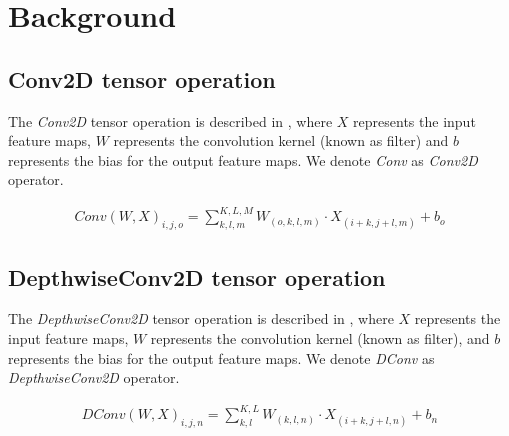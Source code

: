 \section{Background}
\label{sec:background}
\subsection{Conv2D tensor operation}
The \emph{Conv2D} tensor operation is described in , where $X$ represents the input feature maps, $W$ represents the convolution kernel (known as filter) and $b$ represents the bias for the output feature maps\cite{goodfellow2016deep}. We denote \emph{Conv} as \emph{Conv2D} operator.

\begin{eqnarray} \label{eq:conv2D}
Conv\left(W,X\right)_{i,j,o}=\sum_{k,l,m}^{K,L,M}W_{(o,k,l,m)} \cdot X_{(i+k,j+l,m)}+b_{o}
\end{eqnarray} 	
 	
\subsection{DepthwiseConv2D tensor operation}
The \emph{DepthwiseConv2D} tensor operation is described in , where $X$ represents the input feature maps, $W$ represents the convolution kernel (known as filter), and $b$ represents the bias for the output feature maps. We denote \emph{DConv} as \emph{DepthwiseConv2D} operator.

\begin{eqnarray} \label{eq:dconv2D}
DConv\left(W,X\right)_{i,j,n}=\sum_{k,l}^{K,L}W_{(k,l,n)} \cdot X_{(i+k,j+l,n)}+b_{n}
\end{eqnarray}